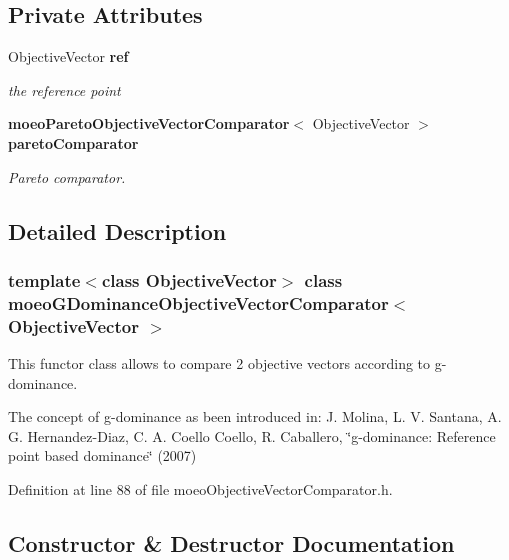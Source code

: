 \subsection*{Private Attributes}
\begin{CompactItemize}
\item 
Objective\-Vector {\bf ref}\label{classmoeoGDominanceObjectiveVectorComparator_55abecc05f8768dda29695c0aff608db}

\begin{CompactList}\small\item\em the reference point \item\end{CompactList}\item 
{\bf moeo\-Pareto\-Objective\-Vector\-Comparator}$<$ Objective\-Vector $>$ {\bf pareto\-Comparator}\label{classmoeoGDominanceObjectiveVectorComparator_5768e6444e546f1da2f36ccabcfc1f70}

\begin{CompactList}\small\item\em Pareto comparator. \item\end{CompactList}\end{CompactItemize}


\subsection{Detailed Description}
\subsubsection*{template$<$class Objective\-Vector$>$ class moeo\-GDominance\-Objective\-Vector\-Comparator$<$ Objective\-Vector $>$}

This functor class allows to compare 2 objective vectors according to g-dominance. 

The concept of g-dominance as been introduced in: J. Molina, L. V. Santana, A. G. Hernandez-Diaz, C. A. Coello Coello, R. Caballero, \char`\"{}g-dominance: Reference point based dominance\char`\"{} (2007) 



Definition at line 88 of file moeo\-Objective\-Vector\-Comparator.h.

\subsection{Constructor \& Destructor Documentation}
